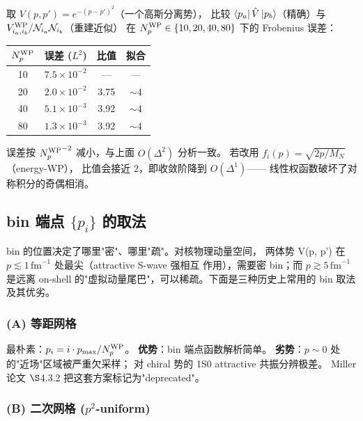 \begin{example}
\label{ex:ch05-completeness}
取 \(V(p, p') = e^{-(p-p')^2}\)（一个高斯分离势），
比较 \(\bra{p_a}\hat{V}\ket{p_b}\)（精确）与
\(V_{i_a, i_b}^{\rm WP} / \mathcal{N}_{i_a}\mathcal{N}_{i_b}\)（重建近似）
在 \({N_{p}^{\text{WP}}} \in \{10, 20, 40, 80\}\) 下的 Frobenius 误差：
\begin{center}
\begin{tabular}{cccc}
\toprule
\({N_{p}^{\text{WP}}}\) & 误差 (\(L^2\)) & 比值 & 拟合 \\
\midrule
 10 &  \(7.5 \times 10^{-2}\) & --- & --- \\
 20 &  \(2.0 \times 10^{-2}\) & 3.75 & \(\sim 4\) \\
 40 &  \(5.1 \times 10^{-3}\) & 3.92 & \(\sim 4\) \\
 80 &  \(1.3 \times 10^{-3}\) & 3.92 & \(\sim 4\) \\
\bottomrule
\end{tabular}
\end{center}
误差按 \({N_{p}^{\text{WP}}}^{-2}\) 减小，与上面 \(O(\Delta^2)\) 分析一致。
若改用 \(f_i(p) = \sqrt{2p/M_N}\)（energy-WP），
比值会接近 \(2\)，即收敛阶降到 \(O(\Delta^1)\)——
线性权函数破坏了对称积分的奇偶相消。
\end{example}

\subsection{bin 端点 \(\{p_i\}\) 的取法}
\label{subsec:ch05-binedges}

bin 的位置决定了哪里"密"、哪里"疏"。对核物理动量空间，
两体势 V(p, p') 在 \(p \lesssim 1\,\mathrm{fm}^{-1}\) 处最尖（attractive S-wave 强相互
作用），需要密 bin；而 \(p \gtrsim 5\,\mathrm{fm}^{-1}\) 是远离 on-shell
的"虚拟动量尾巴"，可以稀疏。下面是三种历史上常用的 bin 取法及其优劣。

\subsubsection{(A) 等距网格}

最朴素：\(p_i = i \cdot p_{\max} / {N_{p}^{\text{WP}}}\)。
\textbf{优势}：bin 端点函数解析简单。
\textbf{劣势}：\(p \sim 0\) 处的"近场"区域被严重欠采样；
对 chiral 势的 1S0 attractive 共振分辨极差。
Miller 论文 \(\S\)4.3.2 把这套方案标记为"deprecated"。

\subsubsection{(B) 二次网格 (\(p^2\)-uniform)}

